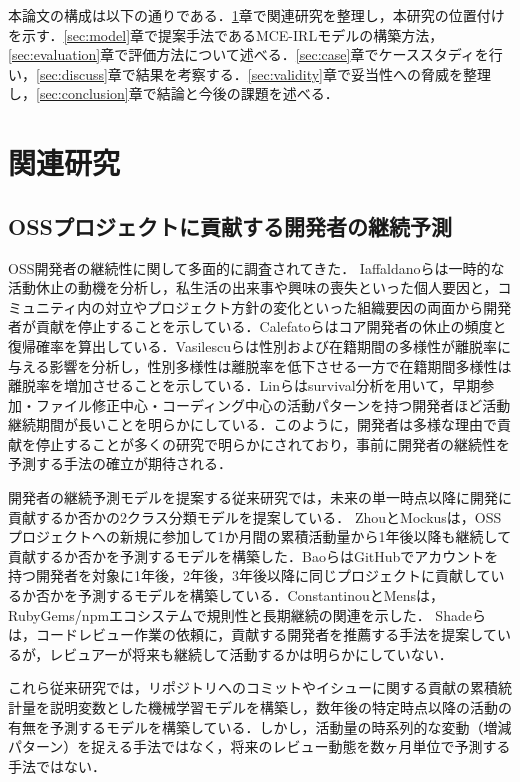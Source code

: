 \documentclass[submit,noauthor,ses,dvipdfmx]{ipsj}
\begin{document}
本論文の構成は以下の通りである．\ref{sec:RelaatedWork}章で関連研究を整理し，本研究の位置付けを示す．\ref{sec:model}章で提案手法であるMCE-IRLモデルの構築方法，\ref{sec:evaluation}章で評価方法について述べる．\ref{sec:case}章でケーススタディを行い，\ref{sec:discuss}章で結果を考察する．\ref{sec:validity}章で妥当性への脅威を整理し，\ref{sec:conclusion}章で結論と今後の課題を述べる．

\section{関連研究}\label{sec:RelaatedWork}

\subsection{OSSプロジェクトに貢献する開発者の継続予測}
OSS開発者の継続性に関して多面的に調査されてきた．
Iaffaldanoらは一時的な活動休止の動機を分析し，私生活の出来事や興味の喪失といった個人要因と，コミュニティ内の対立やプロジェクト方針の変化といった組織要因の両面から開発者が貢献を停止することを示している\cite{iaffaldano}．Calefatoらはコア開発者の休止の頻度と復帰確率を算出している\cite{calefato}．Vasilescuらは性別および在籍期間の多様性が離脱率に与える影響を分析し，性別多様性は離脱率を低下させる一方で在籍期間多様性は離脱率を増加させることを示している\cite{vasilescu}．Linらはsurvival分析を用いて，早期参加・ファイル修正中心・コーディング中心の活動パターンを持つ開発者ほど活動継続期間が長いことを明らかにしている\cite{lin}．このように，開発者は多様な理由で貢献を停止することが多くの研究で明らかにされており，事前に開発者の継続性を予測する手法の確立が期待される．

開発者の継続予測モデルを提案する従来研究では，未来の単一時点以降に開発に貢献するか否かの2クラス分類モデルを提案している．
ZhouとMockusは，OSSプロジェクトへの新規に参加して1か月間の累積活動量から1年後以降も継続して貢献するか否かを予測するモデルを構築した\cite{zhou}．BaoらはGitHubでアカウントを持つ開発者を対象に1年後，2年後，3年後以降に同じプロジェクトに貢献しているか否かを予測するモデルを構築している\cite{bao}．ConstantinouとMensは，RubyGems/npmエコシステムで規則性と長期継続の関連を示した\cite{constantinou}．
Shadeらは，コードレビュー作業の依頼に，貢献する開発者を推薦する手法を提案しているが，レビュアーが将来も継続して活動するかは明らかにしていない．

これら従来研究では，リポジトリへのコミットやイシューに関する貢献の累積統計量を説明変数とした機械学習モデルを構築し，数年後の特定時点以降の活動の有無を予測するモデルを構築している．しかし，活動量の時系列的な変動（増減パターン）を捉える手法ではなく，将来のレビュー動態を数ヶ月単位で予測する手法ではない．
\end{document}
